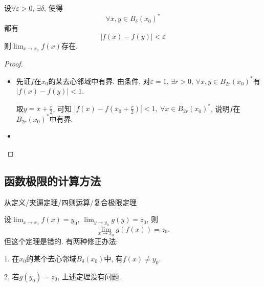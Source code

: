 \begin{theorem}[Cauchy收敛准则]
    设$\forall \varepsilon>0$, $\exists \delta $, 使得
    \begin{equation}
      \forall x,y \in  B_{\delta}\left( x_0 \right) ^{*}
    \end{equation}
    都有
    \begin{equation}
      \left| f\left( x \right) -f\left( y \right)  \right|  < \varepsilon
    \end{equation}
    则$\displaystyle \lim_{x \to x_0} f\left( x \right) $存在.
\end{theorem}
\begin{proof}

    \begin{itemize}
        \item 先证$f$在$x_0$的某去心邻域中有界.
        由条件, 对$\varepsilon =1$, $\exists r >0$, $\forall x,y \in B_{2r}\left( x_0 \right) ^{*}$有$\left| f\left( x \right) - f \left( y \right)  \right| < 1$.
        
        取$y = x + \frac{r}{2}$, 可知 $\left| f\left( x \right) - f\left( x_0 + \frac{r}{2} \right)  \right| < 1, \ \forall  x \in B_{2r}\left( x_0 \right) ^{*}$, 说明$f$在$B_{2r}\left( x_0 \right) ^{*}$中有界.

        \item 
    \end{itemize}
\end{proof}

\subsection{函数极限的计算方法}
从定义/夹逼定理/四则运算/复合极限定理

\begin{theorem}
    设$\displaystyle \lim_{x \to x_0}f\left( x \right) = y_0, \ \lim_{y \to y_0}g\left( y \right) = z_0$, 则
    \begin{equation}
      \lim_{x \to x_0} g\left( f\left( x \right)  \right) = z_0.
    \end{equation}
    但这个定理是错的.
    有两种修正办法:

    1. 在$x_0$的某个去心邻域$B_{\delta}\left( x_0 \right) $中, 有$f\left( x \right) \neq y_0$.

    2. 若$g\left( y_0 \right) = z_0$, 上述定理没有问题.
\end{theorem}
% 
%
% 
% 
% 


